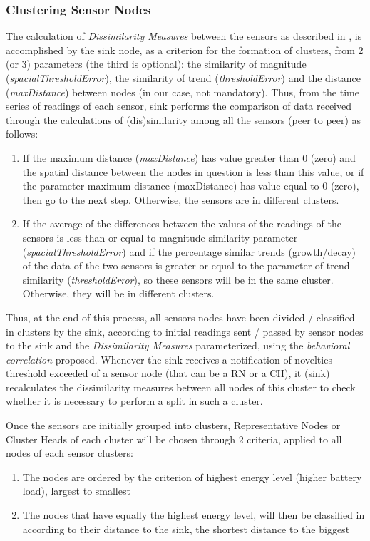 \documentclass[conference]{IEEEtran}
\begin{document}
\subsubsection{Clustering Sensor Nodes}

The calculation of \textit{Dissimilarity Measures} between the sensors as
described in \cite{Liu2007}, is accomplished by the sink node, as a criterion
for the formation of clusters, from 2 (or 3) parameters (the third is optional):
the similarity of magnitude (\textit{spacialThresholdError}), the similarity of
trend (\textit{thresholdError}) and the distance (\textit{maxDistance}) between
nodes (in our case, not mandatory). Thus, from the time series of readings of
each sensor, sink performs the comparison of data received through the
calculations of (dis)similarity among all the sensors (peer to peer) as follows:

\begin{enumerate}
    \item If the maximum distance (\textit{maxDistance}) has value greater than
0 (zero) and the spatial distance between the nodes in question is less than
this value, or if the parameter maximum distance (maxDistance) has value equal
to 0 (zero), then go to the next step. Otherwise, the sensors are in different
clusters.
    \item If the average of the differences between the values of the readings
of the sensors is less than or equal to magnitude similarity parameter
(\textit{spacialThresholdError}) and if the percentage similar trends
(growth/decay) of the data of the two sensors is greater or equal to the
parameter of trend similarity (\textit{thresholdError}), so these sensors
will be in the same cluster. Otherwise, they will be in different clusters.
 \end{enumerate}

Thus, at the end of this process, all sensors nodes have been divided /
classified in clusters by the sink, according to initial readings sent / passed
by sensor nodes to the sink and the \textit{Dissimilarity Measures}
parameterized, using the \textit{behavioral correlation} proposed. Whenever the
sink receives a notification of novelties threshold exceeded of a sensor node
(that can be a RN or a CH), it (sink) recalculates the dissimilarity measures
between all nodes of this cluster to check whether it is necessary to perform a
split in such a cluster.

Once the sensors
are initially grouped into clusters, Representative Nodes or Cluster Heads of each
cluster will be chosen through 2 criteria, applied to all nodes of each sensor
clusters:
\begin{enumerate}
    \item The nodes are ordered by the criterion of highest energy level (higher
    battery load), largest to smallest
    \item The nodes that have equally the highest energy level, will then be
    classified in according to their distance to the sink, the shortest distance
    to the biggest
 \end{enumerate}
\end{document}
